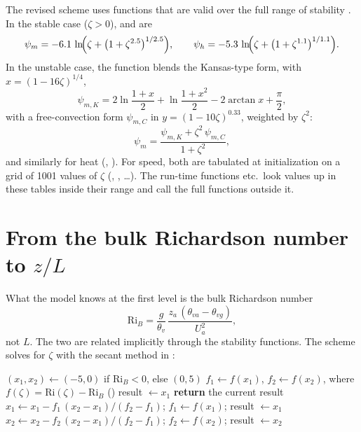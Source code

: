 The revised scheme uses functions that are valid over the full range of stability \citep{jimenez2012}. In the stable
case ($\zeta > 0$),  and  are
\begin{equation}
  \psi_m = -6.1\,\ln\!\Bigl(\zeta + \bigl(1 + \zeta^{2.5}\bigr)^{1/2.5}\Bigr), \qquad
  \psi_h = -5.3\,\ln\!\Bigl(\zeta + \bigl(1 + \zeta^{1.1}\bigr)^{1/1.1}\Bigr).
\end{equation}
In the unstable case, the function blends the Kansas-type form, with $x = (1 - 16\zeta)^{1/4}$,
\begin{equation}
  \psi_{m,K} = 2\ln\frac{1+x}{2} + \ln\frac{1+x^2}{2} - 2\arctan x + \frac{\pi}{2},
\end{equation}
with a free-convection form $\psi_{m,C}$ in $y = (1 - 10\zeta)^{0.33}$, weighted by $\zeta^2$:
\begin{equation}
  \psi_m = \frac{\psi_{m,K} + \zeta^2\,\psi_{m,C}}{1 + \zeta^2},
\end{equation}
and similarly for heat (, ). For speed, both are tabulated at
initialization on a grid of 1001 values of $\zeta$ (, , \dots). The run-time
functions  etc.\ look values up in these tables inside their range and call the full functions
outside it.

\section{From the bulk Richardson number to \texorpdfstring{$z/L$}{z/L}}

What the model knows at the first level is the bulk Richardson number
\begin{equation}
  \mathrm{Ri}_B = \frac{g}{\theta_v}\,\frac{z_a\,(\theta_{va} - \theta_{vg})}{U_a^2},
\end{equation}
not $L$. The two are related implicitly through the stability functions. The scheme solves for $\zeta$ with the
secant method in :
\begin{algorithm}[ht]
\caption{: $\zeta$ from $\mathrm{Ri}_B$ by the secant method.}
\label{alg:zolri}
\begin{algorithmic}[1]
\State $(x_1, x_2) \gets (-5, 0)$ if $\mathrm{Ri}_B < 0$, else $(0, 5)$
\State $f_1 \gets f(x_1)$, $f_2 \gets f(x_2)$, where $f(\zeta) = \mathrm{Ri}(\zeta) - \mathrm{Ri}_B$ ()
\State result $\gets x_1$
   \textbf{return} the current result 
  \EndIf
    \State $x_1 \gets x_1 - f_1\,(x_2 - x_1)/(f_2 - f_1)$; $f_1 \gets f(x_1)$; result $\gets x_1$
  \Else
    \State $x_2 \gets x_2 - f_2\,(x_2 - x_1)/(f_2 - f_1)$; $f_2 \gets f(x_2)$; result $\gets x_2$
  \EndIf
\EndWhile
\end{algorithmic}
\end{algorithm}

